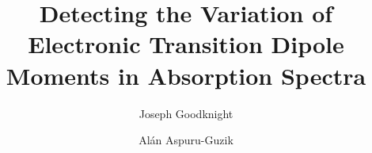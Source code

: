 



\title{Detecting the Variation of Electronic Transition Dipole Moments in Absorption Spectra}
\author{Joseph Goodknight}
\author{Al\'an Aspuru-Guzik}
\begin{abstract}
  
\end{abstract}

\maketitle







